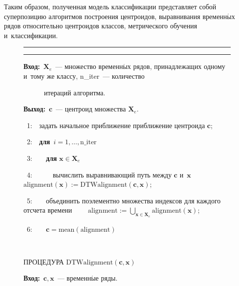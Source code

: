 \begin{multicols}{2}
Таким образом, полученная модель классификации представляет собой 
суперпозицию алгоритмов построения центроидов, выравнивания временн$\acute{\mbox{ы}}$х 
рядов относительно центроидов классов, метрического обучения и~классификации.

\renewcommand{\figurename}{\protect\bf Алгоритм}

\begin{figure*}[b]
\vspace*{9pt}
\hrule

\vspace*{-4pt}

\noindent
{}
\label{DBA_pseudo}

\vspace*{6pt}

\hrule

\vspace*{6pt}

\noindent
\textbf{Вход:}\ $\mathbf{X}_e$~--- множество временн$\acute{\mbox{ы}}$х рядов, принадлежащих 
одному и~тому же классу, n\_iter~--- количество

\ \ \ \ \ \  итераций алгоритма.

\noindent
\textbf{Выход:}\ $\mathbf{c}$~--- центроид множества $\mathbf{X}_e$.

\ 1:\ \ задать начальное приближение приближение центроида $\mathbf{c}$;

\ 2:\ \ \textbf{для}\ $i = 1, \dots, \text{n\_iter}$

\ 3:\ \ \ \ \textbf{для} $\mathbf{x} \in \mathbf{X}_e$

\ 4:\ \ \ \ \ \ вычислить выравнивающий путь между $\mathbf{c}$ и~$\mathbf{x}$\newline
\hphantom{\ 4:}\ \ \ \ \ \ $\mathrm{alignment}(\mathbf{x}) := \mathrm{DTWalignment}(\mathbf{c}, \mathbf{x})$;

\ 5:\ \ \ \ объединить поэлементно множества индексов для каждого отсчета времени\newline
\hphantom{\ 4:}\ \ \ \ $\mathrm{alignment} := \bigcup_{\mathbf{x} \in \mathbf{X}_e} \text{alignment}(\mathbf{x})$;

\ 6:\ \ \ \ $\mathbf{c} = \text{mean}(\text{alignment})$

\


ПРОЦЕДУРА $\mathrm{DTWalignment}(\mathbf{c}, \mathbf{x})$

\noindent
\textbf{Вход:}\ $\mathbf{c}, \mathbf{x}$~--- временн$\acute{\mbox{ы}}$е ряды.


\end{figure*}
\end{multicols}
